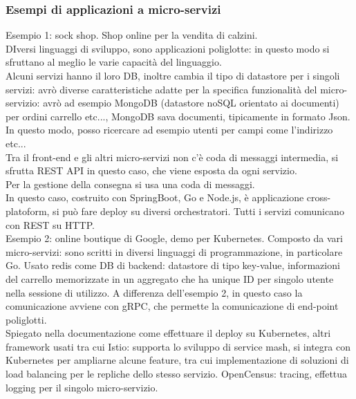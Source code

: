 \documentclass{article}
\begin{document}
\subsubsection{Esempi di applicazioni a micro-servizi}
Esempio 1: sock shop. Shop online per la vendita di calzini.\\ DIversi linguaggi di sviluppo, sono applicazioni poliglotte: in questo modo si sfruttano al meglio le varie capacità del linguaggio.\\ Alcuni servizi hanno il loro DB, inoltre cambia il tipo di datastore per i singoli servizi: avrò diverse caratteristiche adatte per la specifica funzionalità del micro-servizio: avrò ad esempio MongoDB (datastore noSQL orientato ai documenti) per ordini carrello etc..., MongoDB sava documenti, tipicamente in formato Json. In questo modo, posso ricercare ad esempio utenti per campi come l'indirizzo etc...\\ Tra il front-end e gli altri micro-servizi non c'è coda di messaggi intermedia, si sfrutta REST API in questo caso, che viene esposta da ogni servizio.\\ Per la gestione della consegna si usa una coda di messaggi.\\ In questo caso, costruito con SpringBoot, Go e Node.js, è applicazione cross-platoform, si può fare deploy su diversi orchestratori. Tutti i servizi comunicano con REST su HTTP.\\ Esempio 2: online boutique di Google, demo per Kubernetes. Composto da vari micro-servizi: sono scritti in diversi linguaggi di programmazione, in particolare Go. Usato redis come DB di backend: datastore di tipo key-value, informazioni del carrello memorizzate in un aggregato che ha unique ID per singolo utente nella sessione di utilizzo. A differenza dell'esempio 2, in questo caso la comunicazione avviene con gRPC, che permette la comunicazione di end-point poliglotti.\\ Spiegato nella documentazione come effettuare il deploy su Kubernetes, altri framework usati tra cui Istio: supporta lo sviluppo di service mash, si integra con Kubernetes per ampliarne alcune feature, tra cui implementazione di soluzioni di load balancing per le repliche dello stesso servizio. OpenCensus: tracing, effettua logging per il singolo micro-servizio.\\
\end{document}
